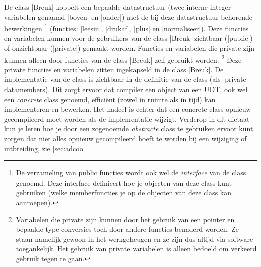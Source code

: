 \begin{cpplstShortInline}
\addtocounter{footnote}{-1}
\makeatletter\let\Hy@footnote@currentHref\saved@Href@A\makeatother 
\addtocounter{BackrefHyperFootnoteCounter}{-1}
\xdef\BackrefFootnoteTag{bhfn:\theBackrefHyperFootnoteCounter}
\makeatletter\let\Hy@footnote@currentHref\saved@Href@B\makeatother
{}
\xdef\BackrefFootnoteTag{bhfn:\theBackrefHyperFootnoteCounter}
De class |Breuk| koppelt een bepaalde datastructuur (twee interne integer variabelen genaamd |boven| en |onder|) met de bij deze datastructuur behorende bewerkingen%
\footnote{%
    De verzameling van public functies wordt ook wel de \emph{interface} van de class genoemd. 
    Deze interface definieert hoe je objecten van deze class kunt gebruiken (welke memberfuncties je op de objecten van deze class kan aanroepen).%
} (functies: |leesin|, |drukaf|, |plus| en |normaliseer|).
Deze functies en variabelen kunnen voor de gebruikers van de class |Breuk| zichtbaar (|public|) of onzichtbaar (|private|) gemaakt worden.
Functies en variabelen die private zijn kunnen alleen door functies van de class |Breuk| zelf gebruikt worden.%
\footnote{%
    Variabelen die private zijn kunnen door het gebruik van een pointer en bepaalde type-conversies toch door andere functies benaderd worden. 
    Ze staan namelijk gewoon in het werkgeheugen en ze zijn dus altijd via software toegankelijk. 
    Het gebruik van private variabelen is alleen bedoeld om  verkeerd gebruik tegen te gaan.
}
Deze private functies en variabelen zitten ingekapseld in de class |Breuk|.
De implementatie van de class is zichtbaar in de definitie van de class (als |private| datamembers). 
Dit zorgt ervoor dat compiler een object van een UDT, ook wel een \emph{concrete} class genoemd, efficiënt (zowel in ruimte als in tijd) kan implementeren en bewerken.
Het nadeel is echter dat een concrete class opnieuw gecompileerd moet worden als de implementatie wijzigt.
Verderop in dit dictaat kun je leren hoe je door een zogenoemde \emph{abstracte} class te gebruiken ervoor kunt zorgen dat niet alles opnieuw gecompileerd hoeft te worden bij een wijziging of uitbreiding, zie \cref{sec:adcoo}. 


\end{cpplstShortInline}
